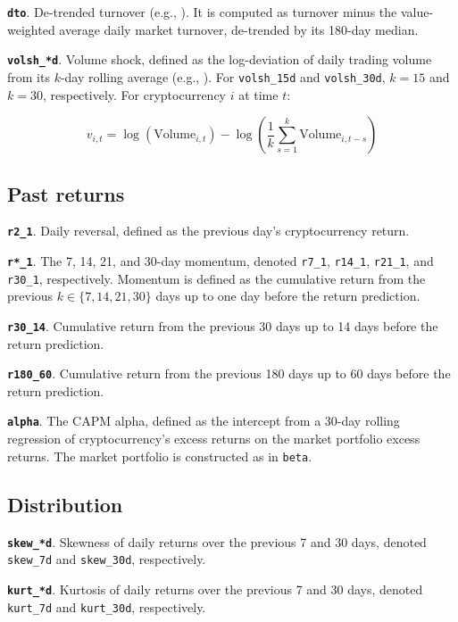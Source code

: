 \documentclass[
  12pt,
  a4paper,
  openany]{scrbook}
\begin{document}
\textbf{\texttt{dto}}. De-trended turnover (e.g.,
). It is
computed as turnover minus the value-weighted average daily market
turnover, de-trended by its 180-day median.

\textbf{\texttt{volsh\_*d}}. Volume shock, defined as the log-deviation
of daily trading volume from its \(k\)-day rolling average (e.g.,
).
For \texttt{volsh\_15d} and \texttt{volsh\_30d}, \(k = 15\) and
\(k = 30\), respectively. For cryptocurrency \(i\) at time \(t\):

\[
v_{i,t} = \log(\text{Volume}_{i,t}) - \log\left( \frac{1}{k} \sum_{s=1}^{k} \text{Volume}_{i,t-s} \right)
\]

\subsection{Past returns}\label{past-returns}

\textbf{\texttt{r2\_1}}. Daily reversal, defined as the previous day's
cryptocurrency return.

\textbf{\texttt{r*\_1}}. The 7, 14, 21, and 30-day momentum, denoted
\texttt{r7\_1}, \texttt{r14\_1}, \texttt{r21\_1}, and \texttt{r30\_1},
respectively. Momentum is defined as the cumulative return from the
previous \(k \in \{7, 14, 21, 30\}\) days up to one day before the
return prediction.

\textbf{\texttt{r30\_14}}. Cumulative return from the previous 30 days
up to 14 days before the return prediction.

\textbf{\texttt{r180\_60}}. Cumulative return from the previous 180 days
up to 60 days before the return prediction.

\textbf{\texttt{alpha}}. The CAPM alpha, defined as the intercept from a
30-day rolling regression of cryptocurrency's excess returns on the
market portfolio excess returns. The market portfolio is constructed as
in \texttt{beta}.

\subsection{Distribution}\label{distribution}

\textbf{\texttt{skew\_*d}}. Skewness of daily returns over the previous
7 and 30 days, denoted \texttt{skew\_7d} and \texttt{skew\_30d},
respectively.

\textbf{\texttt{kurt\_*d}}. Kurtosis of daily returns over the previous
7 and 30 days, denoted \texttt{kurt\_7d} and \texttt{kurt\_30d},
respectively.
\end{document}
